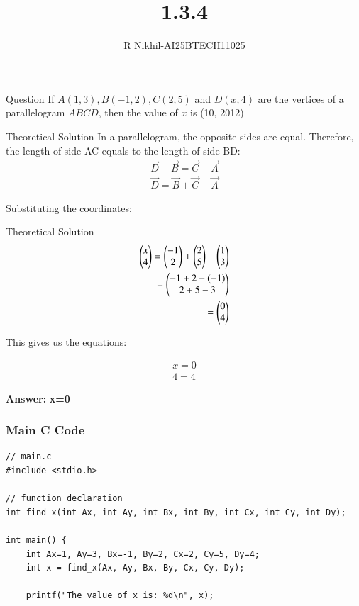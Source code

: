 \documentclass{beamer}
\title %
{1.3.4}
\author %
{R Nikhil-AI25BTECH11025}
\begin{document}
\frame{\titlepage}
\begin{frame}{Question}
If $ A(1, 3), B(-1, 2), C(2, 5) $ and $ D(x, 4) $ are the vertices of a parallelogram \( ABCD \), then the value of $x$ is \underline{\hspace{2cm}}(10, 2012)
\end{frame}

\begin{frame}{Theoretical Solution}
In a parallelogram, the opposite sides are equal. Therefore, the length of side AC equals to the length of side BD:
\begin{align}
\vec{D} - \vec{B} = \vec{C} - \vec{A} \\
\vec{D} = \vec{B} + \vec{C} - \vec{A}
\end{align}

Substituting the coordinates:
\end{frame}

\begin{frame}{Theoretical Solution}
\begin{align}
\begin{pmatrix} x \\ 4 \end{pmatrix} = \begin{pmatrix} -1 \\ 2 \end{pmatrix} + \begin{pmatrix} 2 \\ 5 \end{pmatrix} - \begin{pmatrix} 1 \\ 3 \end{pmatrix} \\
                 = \begin{pmatrix} -1 + 2 - (-1) \\ 2 + 5 - 3 \end{pmatrix} \\
                 = \begin{pmatrix} 0 \\ 4 \end{pmatrix}
\end{align}

This gives us the equations: 

\begin{align}
    x=0  \\
    4=4
\end{align}

\textbf{Answer:}  
\textbf{x=0}
\end{frame}

\begin{frame}[fragile]
\frametitle{Main C Code}
   \begin{lstlisting}
// main.c
#include <stdio.h>

// function declaration
int find_x(int Ax, int Ay, int Bx, int By, int Cx, int Cy, int Dy);

int main() {
    int Ax=1, Ay=3, Bx=-1, By=2, Cx=2, Cy=5, Dy=4;
    int x = find_x(Ax, Ay, Bx, By, Cx, Cy, Dy);

    printf("The value of x is: %d\n", x);

\end{lstlisting}
	\end{frame}
\end{document}
